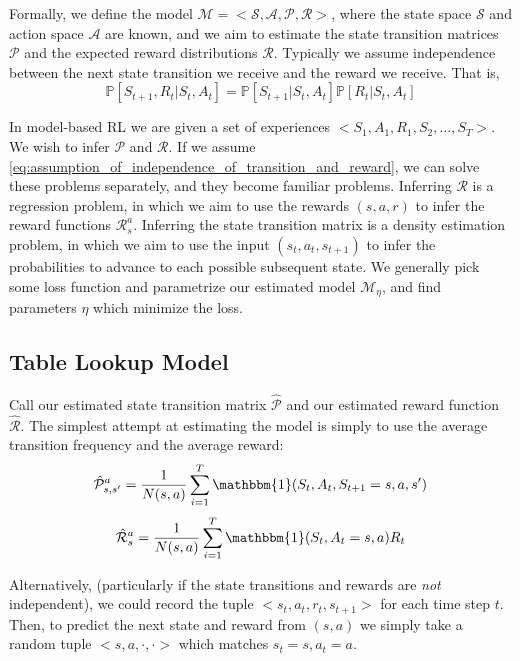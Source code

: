 \documentclass{article}
\newcommand{\ita}{\textit}
\newcommand{\p}{\mathbb{P}}
\begin{document}
Formally, we define the model $\mathcal{M} = <\mathcal{S}, \mathcal{A}, \mathcal{P}, \mathcal{R}>$, where the state space $\mathcal{S}$ and action space $\mathcal{A}$ are known, and we aim to estimate the state transition matrices $\mathcal{P}$ and the expected reward distributions $\mathcal{R}$. Typically we assume independence between the next state transition we receive and the reward we receive. That is,
\begin{equation}\label{eq:assumption_of_independence_of_transition_and_reward}
\p[S_{t+1}, R_t | S_t, A_t] = \p[S_{t+1}| S_t, A_t]\p[R_t | S_t, A_t]
\end{equation}

In model-based RL we are given a set of experiences $<S_1, A_1, R_1, S_2, \ldots, S_T>$. We wish to infer $\mathcal{P}$ and $\mathcal{R}$. If we assume \eqref{eq:assumption_of_independence_of_transition_and_reward}, we can solve these problems separately, and they become familiar problems. Inferring $\mathcal{R}$ is a regression problem, in which we aim to use the rewards $(s, a, r)$ to infer the reward functions $\mathcal{R}^a_s$. Inferring the state transition matrix is a density estimation problem, in which we aim to use the input $(s_t, a_t, s_{t+1})$ to infer the probabilities to advance to each possible subsequent state. We generally pick some loss function and parametrize our estimated model $\mathcal{M}_\eta$, and find parameters $\eta$ which minimize the loss.

\subsection{Table Lookup Model}

Call our estimated state transition matrix $\hat{\mathcal{P}}$ and our estimated reward function $\hat{\mathcal{R}}$. The simplest attempt at estimating the model is simply to use the average transition frequency and the average reward:
\begin{equation}\label{tabel_lookup_transition_freq}
\hat{\mathcal{P}}^a_{s, s'} = \frac{1}{N(s, a)}\sum_{i=1}^T \mathbbm{1}(S_t, A_t, S_{t+1} = s, a, s')
\end{equation}
\begin{equation}\label{tabel_lookup_average_reward}
\hat{\mathcal{R}}^a_s = \frac{1}{N(s, a)}\sum_{i=1}^T \mathbbm{1}(S_t, A_t = s, a)R_t
\end{equation}

Alternatively, (particularly if the state transitions and rewards are \ita{not} independent), we could record the tuple $<s_t, a_t, r_t, s_{t+1}>$ for each time step $t$. Then, to predict the next state and reward from $(s, a)$ we simply take a random tuple $<s, a, \cdot, \cdot>$ which matches $s_t = s, a_t = a$.
\end{document}
